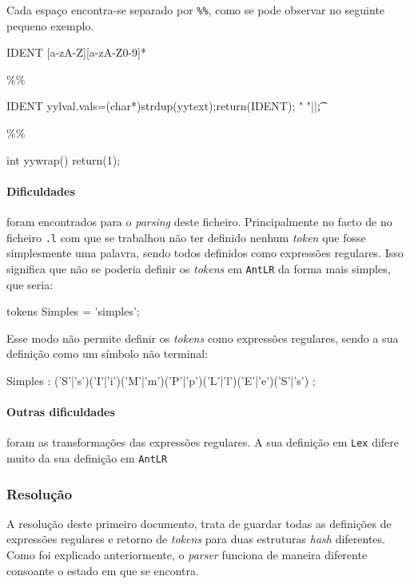 \documentclass[11pt,a4paper]{article}
\begin{document}
Cada espaço encontra-se separado por \texttt{\%\%}, como se pode observar no seguinte pequeno exemplo.\\

\begin{code_txt}
IDENT           [a-zA-Z][a-zA-Z0-9]*

\%\%

{IDENT}                 {yylval.vals=(char*)strdup(yytext);return(IDENT);}
" "|\n|\t               {;}

\%\%

int yywrap()
{ return(1); }

\end{code_txt}

\paragraph{Dificuldades} foram encontrados para o \emph{parsing} deste ficheiro. Principalmente no facto de no ficheiro \texttt{.l} com que se trabalhou não ter definido 
nenhum \emph{token} que fosse simplesmente uma palavra, sendo todos definidos como expressões regulares. Isso significa que não se poderia definir os \emph{tokens} em \texttt{AntLR}
da forma mais simples, que seria:\\

\begin{code_txt}
tokens{
	Simples = 'simples';
}
\end{code_txt}
Esse modo não permite definir os \emph{tokens} como expressões regulares, sendo a sua definição como um símbolo não terminal:\\

\begin{code_txt}
Simples	:	('S'|'s')('I'|'i')('M'|'m')('P'|'p')('L'|'l')('E'|'e')('S'|'s')
	;
\end{code_txt}

\paragraph{Outras dificuldades} foram as transformações das expressões regulares. A sua definição em \texttt{Lex} difere muito da sua definição em \texttt{AntLR}

\subsubsection{Resolução}
A resolução deste primeiro documento, trata de guardar todas as definições de expressões regulares e retorno de \emph{tokens} para duas estruturas \emph{hash} diferentes.
Como foi explicado anteriormente, o \emph{parser} funciona de maneira diferente consoante o estado em que se encontra.\\
\end{document}
